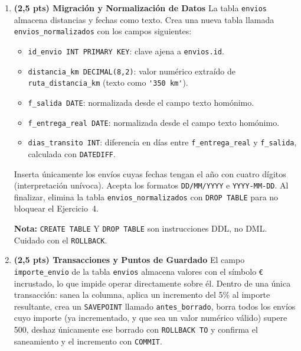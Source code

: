 \documentclass[a4paper,11pt]{article}
\begin{document}
\begin{Form}
\begin{enumerate}[leftmargin=*, label=\textbf{Pregunta \arabic*:}]
    \textbf{Pista:} un \emph{self-join} sobre 100.000 registros es una operación muy costosa y puede provocar \emph{timeout}. Utiliza en su lugar una subconsulta/tabla temporal/CTE que contenga los IDs que deben conservarse y elimina los demás.
    \medskip
    Al finalizar, deshaz los cambios con \texttt{ROLLBACK}: este ejercicio no debe alterar los datos que necesitan los demás.

    \item \textbf{(2,5 pts) Migración y Normalización de Datos}
    La tabla \texttt{envios} almacena distancias y fechas como texto. Crea una nueva tabla llamada \texttt{envios\_normalizados} con los campos siguientes:
    \begin{itemize}
        \item \texttt{id\_envio INT PRIMARY KEY}: clave ajena a \texttt{envios.id}.
        \item \texttt{distancia\_km DECIMAL(8,2)}: valor numérico extraído de \texttt{ruta\_distancia\_km} (texto como \lstinline{'350 km'}).
        \item \texttt{f\_salida DATE}: normalizada desde el campo texto homónimo.
        \item \texttt{f\_entrega\_real DATE}: normalizada desde el campo texto homónimo.
        \item \texttt{dias\_transito INT}: diferencia en días entre \texttt{f\_entrega\_real} y \texttt{f\_salida}, calculada con \texttt{DATEDIFF}.
    \end{itemize}
    Inserta únicamente los envíos cuyas fechas tengan el año con cuatro dígitos (interpretación unívoca). Acepta los formatos \texttt{DD/MM/YYYY} e \texttt{YYYY-MM-DD}.
    \medskip
    Al finalizar, elimina la tabla \texttt{envios\_normalizados} con \texttt{DROP TABLE} para no bloquear el Ejercicio~4. 

    \textbf{Nota:} \texttt{CREATE TABLE} Y  \texttt{DROP TABLE} son instrucciones DDL, no DML. Cuidado con el \texttt{ROLLBACK}.

    \item \textbf{(2,5 pts) Transacciones y Puntos de Guardado}
    El campo \texttt{importe\_envio} de la tabla \texttt{envios} almacena valores con el símbolo \texttt{€} incrustado, lo que impide operar directamente sobre él. Dentro de una única transacción: sanea la columna, aplica un incremento del 5\% al importe resultante, crea un \texttt{SAVEPOINT} llamado \texttt{antes\_borrado}, borra todos los envíos cuyo importe (ya incrementado, y que sea un valor numérico válido) supere 500, deshaz únicamente ese borrado con \texttt{ROLLBACK TO} y confirma el saneamiento y el incremento con \texttt{COMMIT}.

\end{enumerate}

\end{Form}
\end{document}
